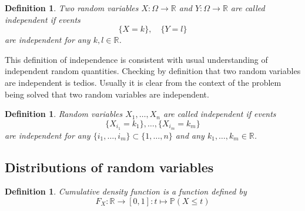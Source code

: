 \documentclass[12pt]{article}
\newtheorem{definition}[theorem]{Definition}
\begin{document}
\begin{definition} Two random variables $X:\Omega\to\mathbb{R}$ and
    $Y:\Omega\to\mathbb{R}$ are called independent if events
    $$
        \{X=k\},\quad \{Y=l\}
    $$
    are independent for any $k,l\in\mathbb{R}$.
\end{definition}

This definition of independence is consistent with usual understanding of
independent random quantities. Checking by definition that two random variables
are independent is tedios. Usually it is clear from the context of the problem
being solved that two random variables are independent.

\begin{definition} Random variables $X_1,\ldots,X_n$ are called independent if
    events
    $$
        \{X_{i_1}=k_1\},\ldots,\{X_{i_m}=k_m\}
    $$
    are independent for any $\{i_1,\ldots,i_m\}\subset \{1,\ldots,n\}$ and any
    $k_1,\ldots,k_m\in\mathbb{R}$.
\end{definition}


\subsection{Distributions of random variables}

\begin{definition} Cumulative density function is a function defined by
    $$
        F_X:\mathbb{R}\to [0,1]: t\mapsto \mathbb{P}(X\leq t)
    $$
\end{definition}
\end{document}
